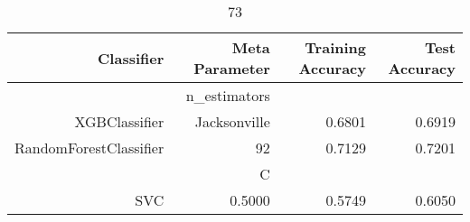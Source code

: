 
\begin{table}[H]
    \caption{73}
    \centering
    \begin{tabular}{|r|r|r|r|}
        \hline
        Classifier &Meta Parameter &Training Accuracy
        &Test Accuracy\\
        \hline
        &n\_estimators &\multicolumn{2}{|r|}{}\\
        \hline
        XGBClassifier &Jacksonville &0.6801 &0.6919\\
        \hline
        RandomForestClassifier &92 &0.7129 &0.7201\\
        \hline
        &C &\multicolumn{2}{|r|}{}\\
        \hline
        SVC &0.5000 &0.5749 &0.6050\\
        \hline
    \end{tabular}
\end{table}

